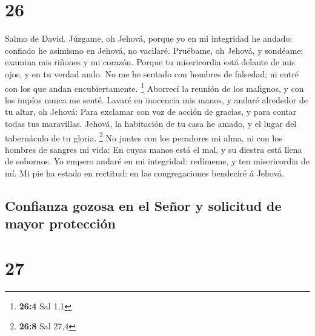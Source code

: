 \hypertarget{section-25}{%
\section{26}\label{section-25}}

 Salmo de David. Júzgame, oh Jehová, porque yo en mi
integridad he andado: confiado he asimismo en Jehová, no vacilaré.
 Pruébame, oh Jehová, y sondéame: examina mis riñones y mi
corazón.  Porque tu misericordia está delante de mis ojos, y
en tu verdad ando.  No me he sentado con hombres de
falsedad; ni entré con los que andan encubiertamente. \footnote{\textbf{26:4}
  Sal 1,1}  Aborrecí la reunión de los malignos, y con los
impíos nunca me senté.  Lavaré en inocencia mis manos, y
andaré alrededor de tu altar, oh Jehová:  Para exclamar con
voz de acción de gracias, y para contar todas tus maravillas.
 Jehová, la habitación de tu casa he amado, y el lugar del
tabernáculo de tu gloria. \footnote{\textbf{26:8} Sal 27,4} 
No juntes con los pecadores mi alma, ni con los hombres de sangres mi
vida:  En cuyas manos está el mal, y su diestra está llena
de sobornos.  Yo empero andaré en mi integridad: redímeme,
y ten misericordia de mí.  Mi pie ha estado en rectitud: en
las congregaciones bendeciré á Jehová.

\hypertarget{confianza-gozosa-en-el-seuxf1or-y-solicitud-de-mayor-protecciuxf3n}{%
\subsection{Confianza gozosa en el Señor y solicitud de mayor
protección}\label{confianza-gozosa-en-el-seuxf1or-y-solicitud-de-mayor-protecciuxf3n}}

\hypertarget{section-26}{%
\section{27}\label{section-26}}

